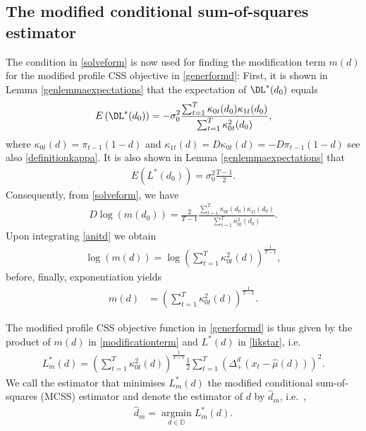 {{    
\subsection{The modified conditional sum-of-squares estimator} \label{Smcss}

The condition in \eqref{solveform} is now used for finding the modification term $m(d)$ for the modified profile CSS objective  in \eqref{generformd}: First, it is shown in Lemma \ref{genlemmaexpectations} that the expectation of $\DL^*(d_0)$ equals 
\begin{align*}
  E\left( \DL^*(d_0) \right) = -\sigma^2_0 \frac{\sum_{t = 1}^T \kappa_{0t}(d_0) \kappa_{1t}(d_0)}{\sum_{t = 1}^T \kappa^2_{0t}(d_0)},
\end{align*}
where $\kappa_{0t}(d) = \pi_{t-1}(1-d)$ and $\kappa_{1t}(d) = D \kappa_{0t}(d) =  -D \pi_{t-1}(1-d)$ see also \eqref{definitionkappa}. It is also shown in Lemma \ref{genlemmaexpectations} that
\begin{align*}
    E\left( L^*(d_0) \right) =  \sigma^2_0 \frac{T-1}{2}.
\end{align*}
Consequently, from \eqref{solveform}, we have
\begin{align}
   D \log\left( m(d_0) \right) = \frac{2}{T-1} \frac{ \sum_{t = 1}^T \kappa_{0t}(d_0) \kappa_{1t}(d_0)}{  \sum_{t = 1}^T \kappa^2_{0t}(d_0) }. \label{anitd}
\end{align}
Upon integrating \eqref{anitd} we obtain
\begin{align*}
   \log\left( m(d) \right) =  \log \left( \sum_{t = 1}^T \kappa^2_{0t}(d) \right)^{\frac{1}{T-1}},
\end{align*}
before, finally, exponentiation yields
\begin{align}
    m(d) &= \left( \sum_{t = 1}^T \kappa^2_{0t}(d)  \right)^{\frac{1}{T-1}}. \label{modificationterm}
\end{align}

The modified profile CSS objective function in \eqref{generformd} is thus given by the product of $m(d)$ in \eqref{modificationterm} and $L^* (d)$ in \eqref{likstar}, i.e.\
\begin{align*}
  L^*_m (d) = \left( \sum_{t = 1}^T \kappa^2_{0t}(d)  \right)^{\frac{1}{T-1}}  \frac{1}{2} \sum_{t = 1}^T \left(  \Delta_{+}^{d} (x_t-\hat{\mu}(d) ) \right)^2 .
\end{align*}
We call the estimator that minimises $L^*_m (d)$ the modified conditional sum-of-squares (MCSS) estimator and denote the estimator of $d$ by $\hat{d}_{m}$, i.e.\ ,
\begin{align}
    \hat{d}_{m} = \operatorname*{argmin}_{d \in \mathbb{D}}  L^*_{m}(d).  \label{MCSS}
\end{align}

}}
